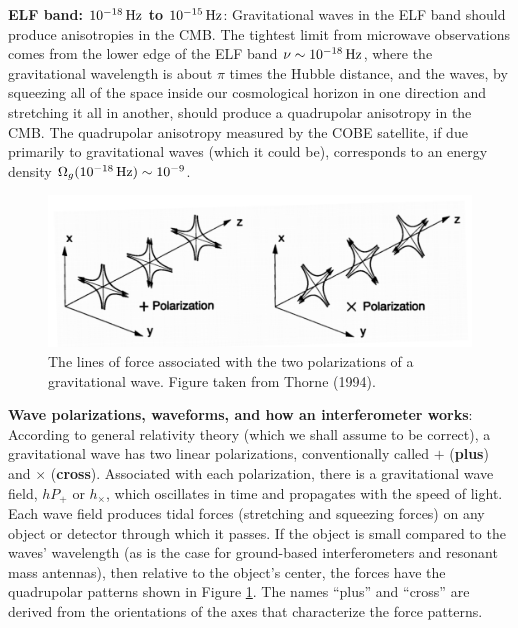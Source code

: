 \documentclass[a4paper,10pt]{article}
\begin{document}
{\noindent}\textbf{ELF band: $10^{-18}\,{\rm Hz}$ to $10^{-15}\,{\rm Hz}$}: Gravitational waves in the ELF band should produce anisotropies in the CMB. The tightest limit from microwave observations comes from the lower edge of the ELF band $\nu\sim10^{-18}\,{\rm Hz}$, where the gravitational wavelength is about $\pi$ times the Hubble distance, and the waves, by squeezing all of the space inside our cosmological horizon in one direction and stretching it all in another, should produce a quadrupolar anisotropy in the CMB. The quadrupolar anisotropy measured by the COBE satellite, if due primarily to gravitational waves (which it could be), corresponds to an energy density $\Omega_g(10^{-18}\,{\rm Hz})\sim10^{-9}$.

\begin{figure}[h]
    \centering
    \includegraphics[width=15cm]{figures/ForceLines.png}
    \caption{\footnotesize{The lines of force associated with the two polarizations of a gravitational wave. Figure taken from Thorne (1994).}}
    \label{fig:forcelines}
\end{figure}

{\noindent}\textbf{Wave polarizations, waveforms, and how an interferometer works}: According to general relativity theory (which we shall assume to be correct), a gravitational wave has two linear polarizations, conventionally called $+$ (\textbf{plus}) and $\times$ (\textbf{cross}). Associated with each polarization, there is a gravitational wave field, $hP_+$ or $h_\times$, which oscillates in time and propagates with the speed of light. Each wave field produces tidal forces (stretching and squeezing forces) on any object or detector through which it passes. If the object is small compared to the waves' wavelength (as is the case for ground-based interferometers and resonant mass antennas), then relative to the object's center, the forces have the quadrupolar patterns shown in Figure \ref{fig:forcelines}. The names ``plus'' and ``cross'' are derived from the orientations of the axes that characterize the force patterns.
\end{document}
